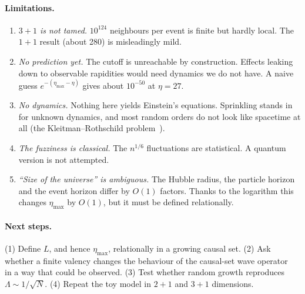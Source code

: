 \documentclass[11pt,a4paper]{article}
\begin{document}
\paragraph{Limitations.}
\begin{enumerate}[leftmargin=*,itemsep=1pt]
\item \emph{$3+1$ is not tamed.} $10^{124}$ neighbours per event is finite but hardly local. The $1+1$ result (about 280) is misleadingly mild.
\item \emph{No prediction yet.} The cutoff is unreachable by construction. Effects leaking down to observable rapidities would need dynamics we do not have. A naive guess $e^{-(\eta_{\max}-\eta)}$ gives about $10^{-50}$ at $\eta=27$.
\item \emph{No dynamics.} Nothing here yields Einstein's equations. Sprinkling stands in for unknown dynamics, and most random orders do not look like spacetime at all (the Kleitman--Rothschild problem~\cite{Surya19}).
\item \emph{The fuzziness is classical.} The $n^{1/6}$ fluctuations are statistical. A quantum version is not attempted.
\item \emph{``Size of the universe'' is ambiguous.} The Hubble radius, the particle horizon and the event horizon differ by $O(1)$ factors. Thanks to the logarithm this changes $\eta_{\max}$ by $O(1)$, but it must be defined relationally.
\end{enumerate}

\paragraph{Next steps.} (1) Define $L$, and hence $\eta_{\max}$, relationally in a growing causal set. (2) Ask whether a finite valency changes the behaviour of the causal-set wave operator~\cite{Sorkin07} in a way that could be observed. (3) Test whether random growth reproduces $\Lambda\sim1/\sqrt N$. (4) Repeat the toy model in $2+1$ and $3+1$ dimensions.

\appendix
\end{document}
